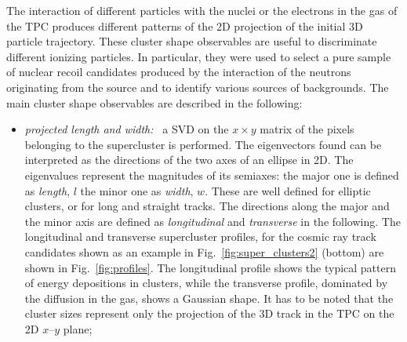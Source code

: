 The interaction of different particles with the nuclei or the
electrons in the gas of the TPC produces different patterns of the 2D
projection of the initial 3D particle trajectory.  These cluster shape
observables are useful to discriminate different ionizing
particles. In particular, they were used to select a pure sample of
nuclear recoil candidates produced by the interaction of the neutrons
originating from the \ambe source and to identify various sources of
backgrounds. The main cluster shape observables are described in the
following:

\begin{itemize}
  \item \textit{projected length and width:~} a SVD on the $x \times
    y$ matrix of the pixels belonging to the supercluster is
    performed. The eigenvectors found can be interpreted as the
    directions of the two axes of an ellipse in 2D. The eigenvalues
    represent the magnitudes of its semiaxes: the major one is defined
    as \textit{length}, $l$ the minor one as \textit{width},
    $w$. These are well defined for elliptic clusters, or for long and
    straight tracks. The directions along the major and the minor axis
    are defined as \textit{longitudinal} and \textit{transverse} in
    the following. The longitudinal and transverse supercluster
    profiles, for the cosmic ray track candidates shown as an example
    in Fig.~\ref{fig:super_clusters2} (bottom) are shown in
    Fig.~\ref{fig:profiles}. The longitudinal profile shows the
    typical pattern of energy depositions in clusters, while the
    transverse profile, dominated by the diffusion in the gas, shows a
    Gaussian shape. It has to be noted that the cluster sizes
    represent only the projection of the 3D track in the TPC on the 2D
    $x$--$y$ plane;


\end{itemize}
